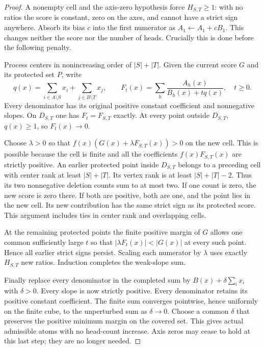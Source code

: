 \documentclass[11pt]{article}
\begin{document}
\begin{proof}
A nonempty cell and the axis-zero hypothesis force $H_{S,T}\geq1$:
with no ratios the score is constant, zero on the axes, and cannot have
a strict sign anywhere. Absorb its bias $c$ into the first numerator
as $A_1\leftarrow A_1+cB_1$. This changes neither the score nor the
number of heads. Crucially this is done before the following penalty.

Process centers in nonincreasing order of $|S|+|T|$. Given the current
score $G$ and its protected set $P$, write
\[
q(x)=\sum_{i\in A\setminus S}x_i+\sum_{j\in B\setminus T}x_j,
\qquad
F_t(x)=\sum_h\frac{A_h(x)}{B_h(x)+tq(x)},\quad t\geq0.
\]
Every denominator has its original positive constant coefficient and
nonnegative slopes. On $D_{S,T}$ one has $F_t=F_{S,T}$ exactly.
At every point outside $D_{S,T}$, $q(x)\geq1$, so $F_t(x)\to0$.

Choose $\lambda>0$ so that
$f(x)(G(x)+\lambda F_{S,T}(x))>0$ on the new cell. This is possible
because the cell is finite and all the coefficients
$f(x)F_{S,T}(x)$ are strictly positive.
An earlier protected point inside $D_{S,T}$ belongs to a preceding
cell with center rank at least $|S|+|T|$. Its vertex rank is at least
$|S|+|T|-2$. Thus its two nonnegative deletion counts sum to at most
two. If one count is zero, the new score is zero there. If both are
positive, both are one, and the point lies in the new cell. Its new
contribution has the same strict sign as its protected score. This
argument includes ties in center rank and overlapping cells.

At the remaining protected points the finite positive margin of $G$
allows one common sufficiently large $t$ so that
$|\lambda F_t(x)|<|G(x)|$ at every such point. Hence all earlier
strict signs persist. Scaling each numerator by $\lambda$ uses
exactly $H_{S,T}$ new ratios. Induction completes the weak-slope sum.

Finally replace every denominator in the completed sum by
$B(x)+\delta\sum_i x_i$ with $\delta>0$. Every slope is now strictly
positive. Every denominator retains its positive constant coefficient.
The finite sum converges pointwise, hence uniformly on the finite cube,
to the unperturbed sum as $\delta\to0$. Choose a common $\delta$ that
preserves the positive minimum margin on the covered set. This gives
actual admissible atoms with no head-count increase. Axis zeros may
cease to hold at this last step; they are no longer needed.
\end{proof}
\end{document}
